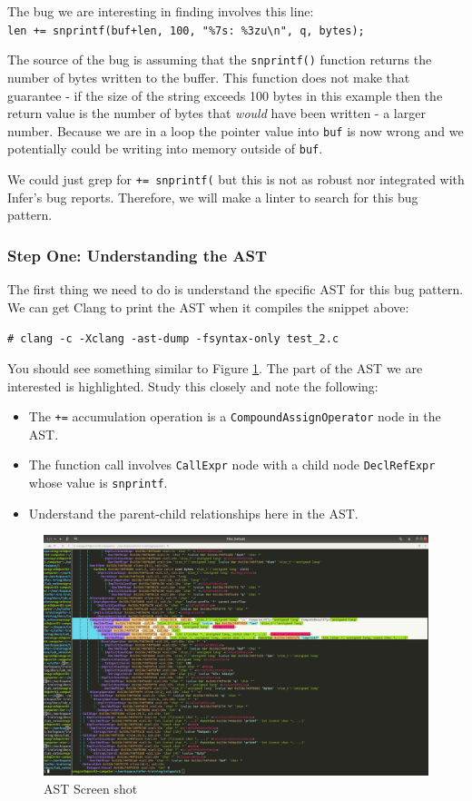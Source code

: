 \noindent The bug we are interesting in finding involves this line:\\
\verb|len += snprintf(buf+len, 100, "%7s: %3zu\n", q, bytes);|

\noindent The source of the bug is assuming that the \verb|snprintf()| function 
returns the number of bytes written to the buffer. This function
does not make that guarantee - if the size of the string exceeds 100 bytes
in this example then the return value is the number of bytes that \textit{would} 
have been written - a larger number. Because we are in a loop the pointer value
into \verb|buf| is now wrong and we potentially could be writing into memory outside of 
\verb|buf|.

We could just grep for \verb|+= snprintf(| but this is not as robust nor integrated 
with Infer's bug reports. Therefore, we will make a linter to search for this bug pattern.

\subsubsection{Step One: Understanding the AST}

The first thing we need to do is understand the specific AST for this bug pattern.
We can get Clang to print the AST when it compiles the snippet above:

\verb|# clang -c -Xclang -ast-dump -fsyntax-only test_2.c|

You should see something similar to Figure \ref{fig:clang-ast}. The part of the AST
we are interested is highlighted. Study this closely and note the following:

\begin{itemize}
	\item The \verb|+=| accumulation operation is a \verb|CompoundAssignOperator| node in the AST.
	\item The function call involves \verb|CallExpr| node with a child node \verb|DeclRefExpr|
	whose value is \verb|snprintf|.
	\item Understand the parent-child relationships here in the AST.
\end{itemize}

\begin{figure}[t]
	\centering
	\includegraphics[width=\linewidth]{./img/clang-ast}
	\caption[AST]{AST Screen shot}
	\label{fig:clang-ast}
\end{figure}


